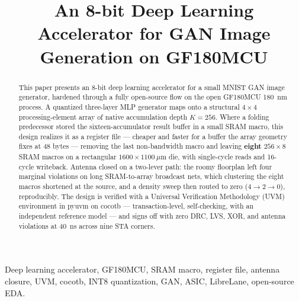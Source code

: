\documentclass[conference,a4paper]{APSIPA2026}
\begin{document}
\title{An 8-bit Deep Learning Accelerator for GAN Image Generation on GF180MCU}

\author{
}

\maketitle
\thispagestyle{firststyle}
\pagestyle{empty}

\begin{abstract}
This paper presents an 8-bit deep learning accelerator for a small MNIST GAN image generator, hardened through a fully open-source flow on the open GF180MCU 180~nm process. A quantized three-layer MLP generator maps onto a structural $4\times4$ processing-element array of native accumulation depth $K=256$. Where a folding predecessor stored the sixteen-accumulator result buffer in a small SRAM macro, this design realizes it as a register file --- cheaper and faster for a buffer the array geometry fixes at 48 bytes --- removing the last non-bandwidth macro and leaving \textbf{eight} $256\times8$ SRAM macros on a rectangular $1600\times1100~\mu$m die, with single-cycle reads and 16-cycle writeback. Antenna closed on a two-lever path: the roomy floorplan left four marginal violations on long SRAM-to-array broadcast nets, which clustering the eight macros shortened at the source, and a density sweep then routed to zero ($4\rightarrow2\rightarrow0$), reproducibly. The design is verified with a Universal Verification Methodology (UVM) environment in pyuvm on cocotb --- transaction-level, self-checking, with an independent reference model --- and signs off with zero DRC, LVS, XOR, and antenna violations at 40~ns across nine STA corners.
\end{abstract}

\begin{IEEEkeywords}
Deep learning accelerator, GF180MCU, SRAM macro, register file, antenna closure, UVM, cocotb, INT8 quantization, GAN, ASIC, LibreLane, open-source EDA.
\end{IEEEkeywords}
\end{document}
